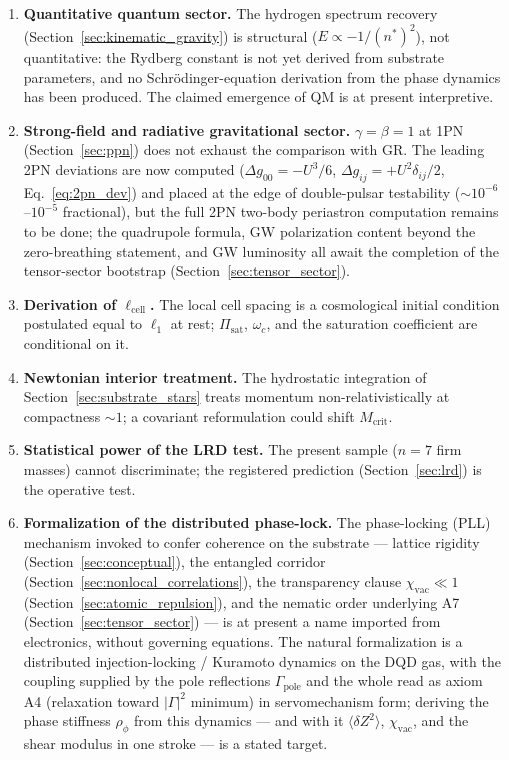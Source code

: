 \documentclass[11pt,a4paper]{article}
\theoremstyle{plain}
\theoremstyle{remark}
\begin{document}
\begin{enumerate}
    \item \textbf{Quantitative quantum sector.} The hydrogen spectrum recovery (Section~\ref{sec:kinematic_gravity}) is structural ($E \propto -1/(n^*)^2$), not quantitative: the Rydberg constant is not yet derived from substrate parameters, and no Schr\"odinger-equation derivation from the phase dynamics has been produced. The claimed emergence of QM is at present interpretive.
    \item \textbf{Strong-field and radiative gravitational sector.} $\gamma = \beta = 1$ at 1PN (Section~\ref{sec:ppn}) does not exhaust the comparison with GR. The leading 2PN deviations are now computed ($\Delta g_{00} = -U^3/6$, $\Delta g_{ij} = +U^2\delta_{ij}/2$, Eq.~\eqref{eq:2pn_dev}) and placed at the edge of double-pulsar testability ($\sim10^{-6}$--$10^{-5}$ fractional), but the full 2PN two-body periastron computation remains to be done; the quadrupole formula, GW polarization content beyond the zero-breathing statement, and GW luminosity all await the completion of the tensor-sector bootstrap (Section~\ref{sec:tensor_sector}).
    \item \textbf{Derivation of $\ell_{\text{cell}}$.} The local cell spacing is a cosmological initial condition postulated equal to $\ell_1$ at rest; $\Pi_{\text{sat}}$, $\omega_c$, and the saturation coefficient are conditional on it.
    \item \textbf{Newtonian interior treatment.} The hydrostatic integration of Section~\ref{sec:substrate_stars} treats momentum non-relativistically at compactness $\sim1$; a covariant reformulation could shift $M_{\text{crit}}$.
    \item \textbf{Statistical power of the LRD test.} The present sample ($n=7$ firm masses) cannot discriminate; the registered prediction (Section~\ref{sec:lrd}) is the operative test.
    \item \textbf{Formalization of the distributed phase-lock.} The phase-locking (PLL) mechanism invoked to confer coherence on the substrate --- lattice rigidity (Section~\ref{sec:conceptual}), the entangled corridor (Section~\ref{sec:nonlocal_correlations}), the transparency clause $\chi_{\text{vac}}\ll1$ (Section~\ref{sec:atomic_repulsion}), and the nematic order underlying A7 (Section~\ref{sec:tensor_sector}) --- is at present a name imported from electronics, without governing equations. The natural formalization is a distributed injection-locking / Kuramoto dynamics on the DQD gas, with the coupling supplied by the pole reflections $\Gamma_{\text{pole}}$ and the whole read as axiom A4 (relaxation toward $|\Gamma|^2$ minimum) in servomechanism form; deriving the phase stiffness $\rho_\phi$ from this dynamics --- and with it $\langle\delta Z^2\rangle$, $\chi_{\text{vac}}$, and the shear modulus in one stroke --- is a stated target.

\end{enumerate}
\end{document}
